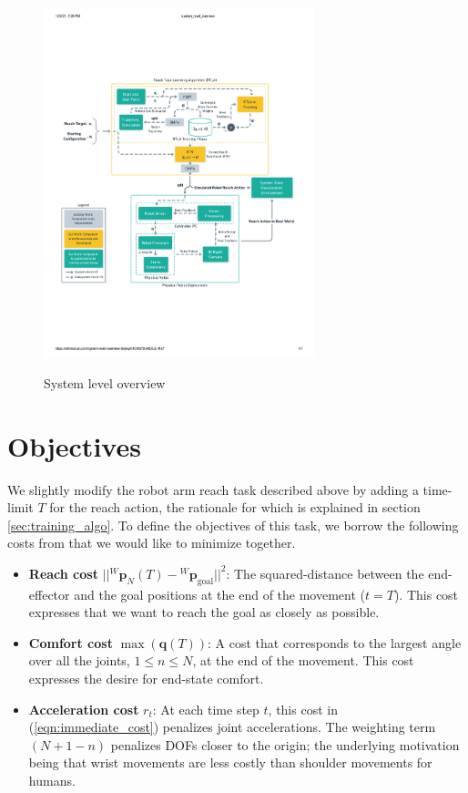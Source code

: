 \documentclass[10pt]{article}
\begin{document}
\begin{figure}[ht]
\centering
\includegraphics[width=0.7\textwidth]{system_level_overview.pdf}
\label{fig:system_level_overview}
\caption{System level overview}
\end{figure}

\section{Objectives}
We slightly modify the robot arm reach task described above by adding a time-limit $T$ for the reach action, the rationale for which is explained in section \ref{sec:training_algo}. To define the objectives of this task, we borrow the following costs from \cite{pdff} that we would like to minimize together.

\begin{itemize}
	\item \textbf{Reach cost} $||{^W\mathbf{p}_{N}(T)} - {^W}\mathbf{p}_{\text{goal}}||^2$: The squared-distance between the end-effector and the goal positions at the end of the movement ($t = T$). This cost expresses that we want to reach the goal as closely as possible.
	\item\textbf{Comfort cost} $\max(\mathbf{q}(T))$: A cost that corresponds to the largest angle over all  the joints, $1\leq n \leq N$, at the end of the movement. This cost expresses the desire for end-state comfort.
	\item \textbf{Acceleration cost} $r_t$: At each time step $t$, this cost in (\ref{eqn:immediate_cost}) penalizes joint accelerations. The weighting term $(N+1-n)$ penalizes DOFs closer to the origin; the underlying motivation being that wrist movements are less costly than shoulder movements for humans.
\end{itemize}
\end{document}
